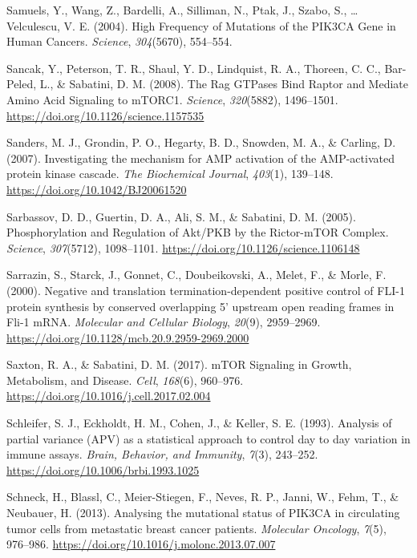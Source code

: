 \documentclass[12pt,openany]{book}
\begin{document}
\hypertarget{ref-Samuels2004}{}
Samuels, Y., Wang, Z., Bardelli, A., Silliman, N., Ptak, J., Szabo, S.,
\ldots{} Velculescu, V. E. (2004). High Frequency of Mutations of the
PIK3CA Gene in Human Cancers. \emph{Science}, \emph{304}(5670),
554--554.

\hypertarget{ref-Sancak2008}{}
Sancak, Y., Peterson, T. R., Shaul, Y. D., Lindquist, R. A., Thoreen, C.
C., Bar-Peled, L., \& Sabatini, D. M. (2008). The Rag GTPases Bind
Raptor and Mediate Amino Acid Signaling to mTORC1. \emph{Science},
\emph{320}(5882), 1496--1501.
\url{https://doi.org/10.1126/science.1157535}

\hypertarget{ref-Sanders2007}{}
Sanders, M. J., Grondin, P. O., Hegarty, B. D., Snowden, M. A., \&
Carling, D. (2007). Investigating the mechanism for AMP activation of
the AMP-activated protein kinase cascade. \emph{The Biochemical
Journal}, \emph{403}(1), 139--148.
\url{https://doi.org/10.1042/BJ20061520}

\hypertarget{ref-Sarbassov2005}{}
Sarbassov, D. D., Guertin, D. A., Ali, S. M., \& Sabatini, D. M. (2005).
Phosphorylation and Regulation of Akt/PKB by the Rictor-mTOR Complex.
\emph{Science}, \emph{307}(5712), 1098--1101.
\url{https://doi.org/10.1126/science.1106148}

\hypertarget{ref-Sarrazin2000}{}
Sarrazin, S., Starck, J., Gonnet, C., Doubeikovski, A., Melet, F., \&
Morle, F. (2000). Negative and translation termination-dependent
positive control of FLI-1 protein synthesis by conserved overlapping 5'
upstream open reading frames in Fli-1 mRNA. \emph{Molecular and Cellular
Biology}, \emph{20}(9), 2959--2969.
\url{https://doi.org/10.1128/mcb.20.9.2959-2969.2000}

\hypertarget{ref-Saxton2017}{}
Saxton, R. A., \& Sabatini, D. M. (2017). mTOR Signaling in Growth,
Metabolism, and Disease. \emph{Cell}, \emph{168}(6), 960--976.
\url{https://doi.org/10.1016/j.cell.2017.02.004}

\hypertarget{ref-Schleifer1993}{}
Schleifer, S. J., Eckholdt, H. M., Cohen, J., \& Keller, S. E. (1993).
Analysis of partial variance (APV) as a statistical approach to control
day to day variation in immune assays. \emph{Brain, Behavior, and
Immunity}, \emph{7}(3), 243--252.
\url{https://doi.org/10.1006/brbi.1993.1025}

\hypertarget{ref-Schneck2013}{}
Schneck, H., Blassl, C., Meier-Stiegen, F., Neves, R. P., Janni, W.,
Fehm, T., \& Neubauer, H. (2013). Analysing the mutational status of
PIK3CA in circulating tumor cells from metastatic breast cancer
patients. \emph{Molecular Oncology}, \emph{7}(5), 976--986.
\url{https://doi.org/10.1016/j.molonc.2013.07.007}
\end{document}

